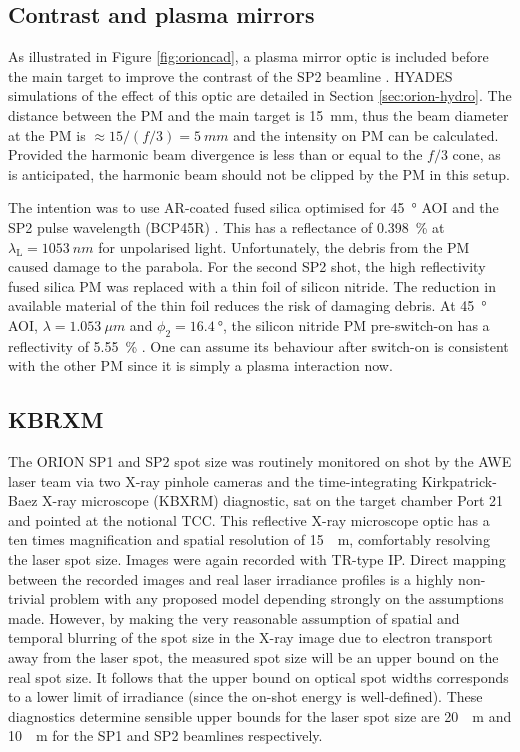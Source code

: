 \subsection{Contrast and plasma mirrors}
As illustrated in Figure \ref{fig:orioncad}, a plasma mirror optic is included before the main target to improve the contrast of the SP2 beamline \cite{doumyCompleteCharacterizationPlasma2004}. HYADES simulations of the effect of this optic are detailed in Section \ref{sec:orion-hydro}. The distance between the PM and the main target is \qty{15}{mm}, thus the beam diameter at the PM is $\approx 15/(f/3) = \qty{5}{mm}$ and the intensity on PM can be calculated. Provided the harmonic beam divergence is less than or equal to the $f/3$ cone, as is anticipated, the harmonic beam should not be clipped by the PM in this setup. 

The intention was to use \ac{AR}-coated fused silica optimised for \qty{45}{\degree} \ac{AOI} and the SP2 pulse wavelength (BCP45R) \cite{45AOIBeamsplitter}. This has a reflectance of \qty{0.398}{\%} at $\lambda_\mathrm{L} = \qty{1053}{nm}$ for unpolarised light. Unfortunately, the debris from the PM caused damage to the parabola. For the second SP2 shot, the high reflectivity fused silica PM was replaced with a thin foil of silicon nitride. The reduction in available material of the thin foil reduces the risk of damaging debris. At \qty{45}{\degree} \ac{AOI}, $\lambda = \qty{1.053}{\mu m}$ and $\phi_2 = \qty{16.4}{\degree}$, the silicon nitride PM pre-switch-on has a reflectivity of \qty{5.55}{\%} \cite{polyanskiyRefractiveindexInfoDatabase2024}. One can assume its behaviour after switch-on is consistent with the other PM since it is simply a plasma interaction now.

\subsection{KBRXM}
The ORION SP1 and SP2 spot size was routinely monitored on shot by the AWE laser team via two X-ray pinhole cameras and the time-integrating Kirkpatrick-Baez X-ray microscope (KBXRM) diagnostic, sat on the target chamber Port 21 and pointed at the notional \ac{TCC}. This reflective X-ray microscope optic has a ten times magnification and spatial resolution of \qty{15}{\mu m}, comfortably resolving the laser spot size. Images were again recorded with TR-type IP. Direct mapping between the recorded images and real laser irradiance profiles is a highly non-trivial problem with any proposed model depending strongly on the assumptions made. However, by making the very reasonable assumption of spatial and temporal blurring of the spot size in the X-ray image due to electron transport away from the laser spot, the measured spot size will be an upper bound on the real spot size. It follows that the upper bound on optical spot widths corresponds to a lower limit of irradiance (since the on-shot energy is well-defined). These diagnostics determine sensible upper bounds for the laser spot size are \qty{20}{\mu m} and \qty{10}{\mu m} for the SP1 and SP2 beamlines respectively.


